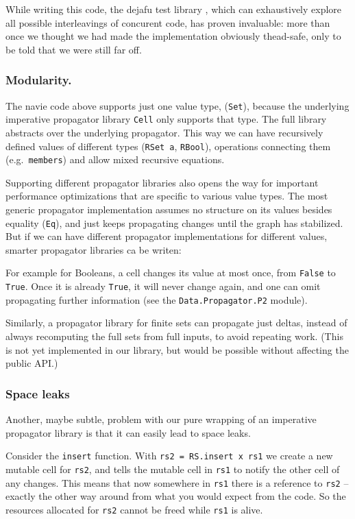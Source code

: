 \documentclass[manuscript,screen,acmsmall]{acmart}
\begin{document}
While writing this code, the dejafu test library \citep{dejafu}, which can exhaustively explore all possible interleavings of concurent code, has proven invaluable: more than once we thought we had made the implementation obviously thead-safe, only to be told that we were still far off.

\subsubsection{Modularity.}

The navie code above supports just one value type, (\verb|Set|), because the underlying imperative propagator library \verb|Cell| only supports that type. The full library abstracts over the underlying propagator. This way we can have recursively defined values of different types (\verb|RSet a|, \verb|RBool|), operations connecting them (e.g.\ \verb|members|) and allow mixed recursive equations.

Supporting different propagator libraries also opens the way for important performance optimizations that are specific to various value types. The most generic propagator implementation assumes no structure on its values besides equality (\verb|Eq|), and just keeps propagating changes until the graph has stabilized. But if we can have different propagator implementations for different values, smarter propagator libraries ca be writen:

For example for Booleans, a cell changes its value at most once, from \verb|False| to \verb|True|. Once it is already \verb|True|, it will never change again, and one can omit propagating further information (see the \verb|Data.Propagator.P2| module).

Similarly, a propagator library for finite sets can propagate just deltas, instead of always recomputing the full sets from full inputs, to avoid repeating work. (This is not yet implemented in our library, but would be possible without affecting the public API.)

\subsubsection{Space leaks}\label{sec:spaceleak}

Another, maybe subtle, problem with our pure wrapping of an imperative propagator library is that it can easily lead to space leaks.

Consider the \verb|insert| function. With \verb|rs2 = RS.insert x rs1| we create a new mutable cell for \verb|rs2|, and tells the mutable cell in \verb|rs1| to notify the other cell of any changes. This means that now somewhere in \verb|rs1| there is a reference to \verb|rs2| -- exactly the other way around from what you would expect from the code. So the resources allocated for \verb|rs2| cannot be freed while \verb|rs1| is alive.
\end{document}

